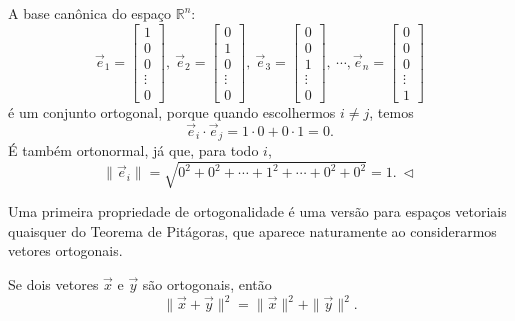 \begin{ex}
	A base canônica do espaço $\mathbb{R}^n$:
	\begin{equation}
	\vec{e}_1 =
	\begin{bmatrix}
	1 \\ 0 \\ 0 \\ \vdots \\ 0
	\end{bmatrix}, \
	\vec{e}_2 =
	\begin{bmatrix}
	0 \\ 1 \\ 0 \\ \vdots \\ 0
	\end{bmatrix}, \
	\vec{e}_3 =
	\begin{bmatrix}
	0 \\ 0 \\ 1 \\ \vdots \\ 0
	\end{bmatrix}, \ \cdots,
	\vec{e}_n =
	\begin{bmatrix}
	0 \\ 0 \\ 0 \\ \vdots \\ 1
	\end{bmatrix}
	\end{equation} é um conjunto ortogonal, porque quando escolhermos $i\neq j$, temos
	\begin{equation}
	\vec{e}_i \cdot \vec{e}_j = 1 \cdot 0 + 0 \cdot 1 = 0.
	\end{equation} É também ortonormal, já que, para todo $i$,
	\begin{equation}
	\| \vec{e}_i\|  = \sqrt{0^2 + 0^2 + \cdots + 1^2 + \cdots + 0^2 + 0^2} = 1. \ \lhd
	\end{equation}
\end{ex}

Uma primeira propriedade de ortogonalidade é uma versão para espaços vetoriais quaisquer do Teorema de Pitágoras, que aparece naturamente ao considerarmos vetores ortogonais.

\begin{teo}
	Se dois vetores $\vec{x}$ e $\vec{y}$ são ortogonais, então
	\begin{equation}
	\|\vec{x} + \vec{y}\|^2 = \|\vec{x}\|^2 + \|\vec{y}\|^2.
	\end{equation}
\end{teo}

